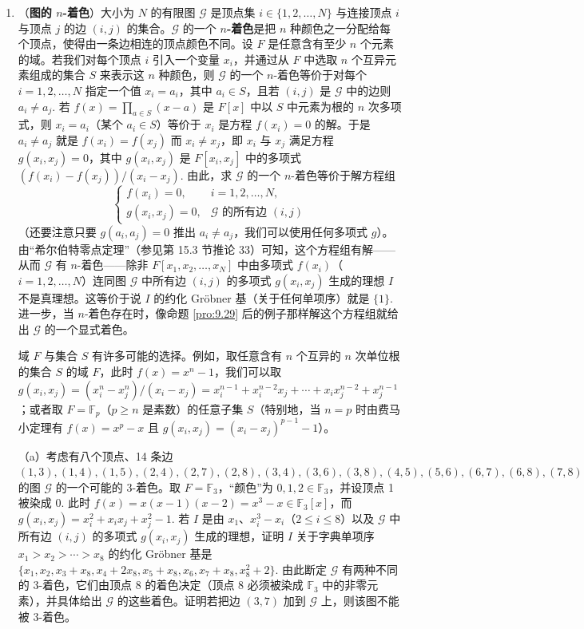 \begin{enumerate}
\item （\textbf{图的 \(n\)-着色}）大小为 \(N\) 的有限图 \(\mathcal{G}\) 是顶点集 \(i \in \{1, 2, \ldots, N\}\) 与连接顶点 \(i\) 与顶点 \(j\) 的边 \((i, j)\) 的集合。\(\mathcal{G}\) 的一个 \textbf{\(n\)-着色}是把 \(n\) 种颜色之一分配给每个顶点，使得由一条边相连的顶点颜色不同。设 \(F\) 是任意含有至少 \(n\) 个元素的域。若我们对每个顶点 \(i\) 引入一个变量 \(x_i\)，并通过从 \(F\) 中选取 \(n\) 个互异元素组成的集合 \(S\) 来表示这 \(n\) 种颜色，则 \(\mathcal{G}\) 的一个 \(n\)-着色等价于对每个 \(i = 1, 2, \ldots, N\) 指定一个值 \(x_i = a_i\)，其中 \(a_i \in S\)，且若 \((i, j)\) 是 \(\mathcal{G}\) 中的边则 \(a_i \neq a_j\). 若 \(f(x) = \prod_{a \in S}(x-a)\) 是 \(F[x]\) 中以 \(S\) 中元素为根的 \(n\) 次多项式，则 \(x_i = a_i\)（某个 \(a_i \in S\)）等价于 \(x_i\) 是方程 \(f(x_i) = 0\) 的解。于是 \(a_i \neq a_j\) 就是 \(f(x_i) = f(x_j)\) 而 \(x_i \neq x_j\)，即 \(x_i\) 与 \(x_j\) 满足方程 \(g(x_i, x_j) = 0\)，其中 \(g(x_i, x_j)\) 是 \(F[x_i, x_j]\) 中的多项式 \((f(x_i)-f(x_j))/(x_i-x_j)\). 由此，求 \(\mathcal{G}\) 的一个 \(n\)-着色等价于解方程组
\[
\begin{cases}
f(x_i) = 0, & i = 1, 2, \ldots, N, \\
g(x_i, x_j) = 0, & \mathcal{G} \text{ 的所有边 } (i, j)
\end{cases}
\]
（还要注意只要 \(g(a_i, a_j) = 0\) 推出 \(a_i \neq a_j\)，我们可以使用任何多项式 \(g\)）。由“希尔伯特零点定理”（参见第 15.3 节推论 33）可知，这个方程组有解——从而 \(\mathcal{G}\) 有 \(n\)-着色——除非 \(F[x_1, x_2, \ldots, x_N]\) 中由多项式 \(f(x_i)\)（\(i = 1, 2, \ldots, N\)）连同图 \(\mathcal{G}\) 中所有边 \((i, j)\) 的多项式 \(g(x_i, x_j)\) 生成的理想 \(I\) 不是真理想。这等价于说 \(I\) 的约化 Gröbner 基（关于任何单项序）就是 \(\{1\}\). 进一步，当 \(n\)-着色存在时，像命题 \ref{pro:9.29} 后的例子那样解这个方程组就给出 \(\mathcal{G}\) 的一个显式着色。

域 \(F\) 与集合 \(S\) 有许多可能的选择。例如，取任意含有 \(n\) 个互异的 \(n\) 次单位根的集合 \(S\) 的域 \(F\)，此时 \(f(x) = x^n-1\)，我们可以取 \(g(x_i, x_j) = (x_i^n-x_j^n)/(x_i-x_j) = x_i^{n-1}+x_i^{n-2}x_j+\cdots+x_ix_j^{n-2}+x_j^{n-1}\)；或者取 \(F = \mathbb{F}_p\)（\(p \geq n\) 是素数）的任意子集 \(S\)（特别地，当 \(n = p\) 时由费马小定理有 \(f(x) = x^p-x\) 且 \(g(x_i, x_j) = (x_i-x_j)^{p-1}-1\)）。

（a）考虑有八个顶点、14 条边 \((1,3), (1,4), (1,5), (2,4), (2,7), (2,8), (3,4), (3,6), (3,8), (4,5), (5,6), (6,7), (6,8), (7,8)\) 的图 \(\mathcal{G}\) 的一个可能的 3-着色。取 \(F = \mathbb{F}_3\)，“颜色”为 \(0, 1, 2 \in \mathbb{F}_3\)，并设顶点 1 被染成 0. 此时 \(f(x) = x(x-1)(x-2) = x^3-x \in \mathbb{F}_3[x]\)，而 \(g(x_i, x_j) = x_i^2+x_ix_j+x_j^2-1\). 若 \(I\) 是由 \(x_1\)、\(x_i^3-x_i\)（\(2 \leq i \leq 8\)）以及 \(\mathcal{G}\) 中所有边 \((i, j)\) 的多项式 \(g(x_i, x_j)\) 生成的理想，证明 \(I\) 关于字典单项序 \(x_1 > x_2 > \cdots > x_8\) 的约化 Gröbner 基是 \(\{x_1, x_2, x_3+x_8, x_4+2x_8, x_5+x_8, x_6, x_7+x_8, x_8^2+2\}\). 由此断定 \(\mathcal{G}\) 有两种不同的 3-着色，它们由顶点 8 的着色决定（顶点 8 必须被染成 \(\mathbb{F}_3\) 中的非零元素），并具体给出 \(\mathcal{G}\) 的这些着色。证明若把边 \((3,7)\) 加到 \(\mathcal{G}\) 上，则该图不能被 3-着色。


\end{enumerate}

